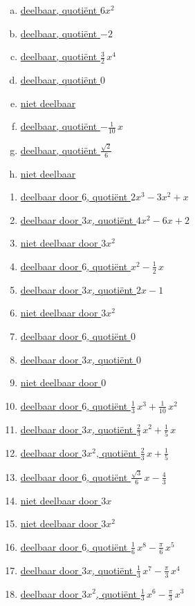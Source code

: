 \documentclass{ximera}
\begin{document}
\begin{oplossing} 
\begin{enumerate}[(a)]
\item
\hyperlink{oef2.1}{deelbaar, quoti\"ent $6x^2$} 
\item
\hyperlink{oef2.1}{deelbaar, quoti\"ent $-2$}
\item
\hyperlink{oef2.1}{deelbaar, quoti\"ent $\frac{3}{2}\,x^4$}
\item
\hyperlink{oef2.1}{deelbaar, quoti\"ent $0$}
\item
\hyperlink{oef2.1}{niet deelbaar}
\item
\hyperlink{oef2.1}{deelbaar, quoti\"ent $-\frac{1}{10}\,x$}
\item
\hyperlink{oef2.1}{deelbaar, quoti\"ent $\frac{\sqrt{2}}{6}$}
\item
\hyperlink{oef2.1}{niet deelbaar}
\end{enumerate}
\end{oplossing} 

\begin{oplossing} 
\begin{enumerate}
\item
\hyperlink{oef2.2}{deelbaar door $6$, quoti\"ent $2x^3 - 3x^2 + x$} 
\item[]
\hyperlink{oef2.2}{deelbaar door $3x$, quoti\"ent $4x^2 - 6x + 2$} 
\item[]
\hyperlink{oef2.2}{niet deelbaar door $3x^2$}
\item
\hyperlink{oef2.2}{deelbaar door $6$, quoti\"ent $x^2 - \frac{1}{2}\,x$} 
\item[]
\hyperlink{oef2.2}{deelbaar door $3x$, quoti\"ent $2x-1$} 
\item[]
\hyperlink{oef2.2}{niet deelbaar door $3x^2$}
\item
\hyperlink{oef2.2}{deelbaar door $6$, quoti\"ent $0$} 
\item[]
\hyperlink{oef2.2}{deelbaar door $3x$, quoti\"ent $0$} 
\item[]
\hyperlink{oef2.2}{niet deelbaar door $0$}
\item
\hyperlink{oef2.2}{deelbaar door $6$, quoti\"ent $\frac{1}{3}\,x^3 + \frac{1}{10}\,x^2$} 
\item[]
\hyperlink{oef2.2}{deelbaar door $3x$, quoti\"ent $\frac{2}{3}\,x^2 + \frac{1}{5}\,x$} 
\item[]
\hyperlink{oef2.2}{deelbaar door $3x^2$, quoti\"ent $\frac{2}{3}\,x + \frac{1}{5}$}
\item
\hyperlink{oef2.2}{deelbaar door $6$, quoti\"ent $\frac{\sqrt{3}}{6}\,x - \frac{4}{3}$} 
\item[]
\hyperlink{oef2.2}{niet deelbaar door $3x$}
\item[]
\hyperlink{oef2.2}{niet deelbaar door $3x^2$}
\item
\hyperlink{oef2.2}{deelbaar door $6$, quoti\"ent $\frac{1}{6}\,x^8 - \frac{\pi}{6}\,x^5$} 
\item[]
\hyperlink{oef2.2}{deelbaar door $3x$, quoti\"ent $\frac{1}{3}\,x^7 - \frac{\pi}{3}\,x^4$} 
\item[]
\hyperlink{oef2.2}{deelbaar door $3x^2$, quoti\"ent $\frac{1}{3}\,x^6 - \frac{\pi}{3}\,x^3$}
\end{enumerate}
\end{oplossing} 
\end{document}
